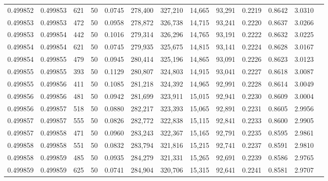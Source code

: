 \begin{tabular}{rrrrrrrrrrrrr}
0.499852 & 0.499853 &   621 &  50 &                                     0.0745 & 278,400 & 327,210 &  14,665 &  93,291 & 0.2219 & 0.8642 & 3.0310 \\
0.499853 & 0.499853 &   472 &  50 &                                     0.0958 & 278,872 & 326,738 &  14,715 &  93,241 & 0.2220 & 0.8637 & 3.0266 \\
0.499853 & 0.499854 &   442 &  50 &                                     0.1016 & 279,314 & 326,296 &  14,765 &  93,191 & 0.2222 & 0.8632 & 3.0225 \\
0.499854 & 0.499854 &   621 &  50 &                                     0.0745 & 279,935 & 325,675 &  14,815 &  93,141 & 0.2224 & 0.8628 & 3.0167 \\
0.499854 & 0.499855 &   479 &  50 &                                     0.0945 & 280,414 & 325,196 &  14,865 &  93,091 & 0.2226 & 0.8623 & 3.0123 \\
0.499855 & 0.499855 &   393 &  50 &                                     0.1129 & 280,807 & 324,803 &  14,915 &  93,041 & 0.2227 & 0.8618 & 3.0087 \\
0.499855 & 0.499856 &   411 &  50 &                                     0.1085 & 281,218 & 324,392 &  14,965 &  92,991 & 0.2228 & 0.8614 & 3.0049 \\
0.499856 & 0.499856 &   481 &  50 &                                     0.0942 & 281,699 & 323,911 &  15,015 &  92,941 & 0.2230 & 0.8609 & 3.0004 \\
0.499856 & 0.499857 &   518 &  50 &                                     0.0880 & 282,217 & 323,393 &  15,065 &  92,891 & 0.2231 & 0.8605 & 2.9956 \\
0.499857 & 0.499857 &   555 &  50 &                                     0.0826 & 282,772 & 322,838 &  15,115 &  92,841 & 0.2233 & 0.8600 & 2.9905 \\
0.499857 & 0.499858 &   471 &  50 &                                     0.0960 & 283,243 & 322,367 &  15,165 &  92,791 & 0.2235 & 0.8595 & 2.9861 \\
0.499858 & 0.499858 &   551 &  50 &                                     0.0832 & 283,794 & 321,816 &  15,215 &  92,741 & 0.2237 & 0.8591 & 2.9810 \\
0.499858 & 0.499859 &   485 &  50 &                                     0.0935 & 284,279 & 321,331 &  15,265 &  92,691 & 0.2239 & 0.8586 & 2.9765 \\
0.499859 & 0.499859 &   625 &  50 &                                     0.0741 & 284,904 & 320,706 &  15,315 &  92,641 & 0.2241 & 0.8581 & 2.9707 \\

\end{tabular}
